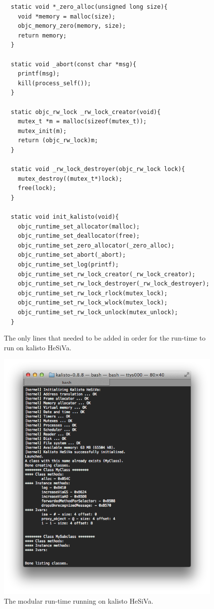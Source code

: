 \begin{figure}
  \begin{verbatim}
  static void *_zero_alloc(unsigned long size){
    void *memory = malloc(size);
    objc_memory_zero(memory, size);
    return memory;
  }
  
  static void _abort(const char *msg){
    printf(msg);
    kill(process_self());
  }
  
  static objc_rw_lock _rw_lock_creator(void){
    mutex_t *m = malloc(sizeof(mutex_t));
    mutex_init(m);
    return (objc_rw_lock)m;
  }
  
  static void _rw_lock_destroyer(objc_rw_lock lock){
    mutex_destroy((mutex_t*)lock);
    free(lock);
  }
  
  static void init_kalisto(void){
    objc_runtime_set_allocator(malloc);
    objc_runtime_set_deallocator(free);
    objc_runtime_set_zero_allocator(_zero_alloc);
    objc_runtime_set_abort(_abort);
    objc_runtime_set_log(printf);
    objc_runtime_set_rw_lock_creator(_rw_lock_creator);
    objc_runtime_set_rw_lock_destroyer(_rw_lock_destroyer);
    objc_runtime_set_rw_lock_rlock(mutex_lock);
    objc_runtime_set_rw_lock_wlock(mutex_lock);
    objc_runtime_set_rw_lock_unlock(mutex_unlock);
  }
  \end{verbatim}
  \centering{}
  \caption{The only lines that needed to be added in order for the run-time to run on kalisto HeSiVa.}
  \label{fig:hesiva_code}
\end{figure}

\begin{figure}
  \includegraphics[width=\textwidth]{img/hesiva.png}
  
  \centering{}
  \caption{The modular run-time running on kalisto HeSiVa.}
  \label{fig:hesiva_run}
\end{figure}

